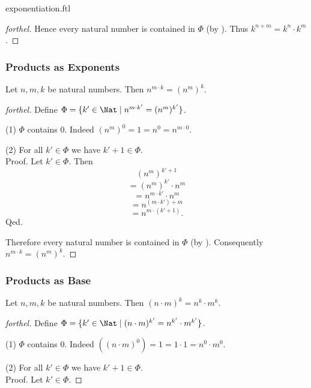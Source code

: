 \documentclass{naproche-library}
\begin{document}
\begin{smodule}{exponentiation.ftl}
\begin{proof}[forthel]
    Hence every natural number is contained in $\Phi$ (by ).
    Thus $k^{n + m} = k^{n} \cdot k^{m}$.
  \end{proof}


  \subsubsection*{Products as Exponents}

  \begin{proposition}[forthel,id=ARITHMETIC_09_7827956571308032]
    Let $n, m, k$ be natural numbers.
    Then $n^{m \cdot k} = (n^{m})^{k}$.
  \end{proposition}
  \begin{proof}[forthel]
    Define $\Phi = \{ k' \in \Nat \mid n^{m \cdot k'} = (n^{m})^{k'} \}$.

    (1) $\Phi$ contains $0$.
    Indeed $(n^{m})^{0}
      = 1
      = n^{0}
      = n^{m \cdot 0}$.

    (2) For all $k' \in \Phi$ we have $k' + 1 \in \Phi$. \\
    Proof.
      Let $k' \in \Phi$.
      Then
      \[  (n^{m})^{k' + 1}                \]
      \[    = (n^{m})^{k'} \cdot n^{m}    \]
      \[    = n^{m \cdot k'} \cdot n^{m}  \]
      \[    = n^{(m \cdot k') + m}        \]
      \[    = n^{m \cdot (k' + 1)}.       \]
    Qed.

    Therefore every natural number is contained in $\Phi$ (by ).
    Consequently $n^{m \cdot k} = (n^{m})^{k}$.
  \end{proof}


  \subsubsection*{Products as Base}

  \begin{proposition}[forthel,id=ARITHMETIC_09_2563032276271104]
    Let $n, m, k$ be natural numbers.
    Then $(n \cdot m)^{k} = n^{k} \cdot m^{k}$.
  \end{proposition}
  \begin{proof}[forthel]
    Define $\Phi = \{ k' \in \Nat \mid (n \cdot m)^{k'} = n^{k'} \cdot m^{k'} \}$.

    (1) $\Phi$ contains $0$.
    Indeed $((n \cdot m)^{0})
      = 1
      = 1 \cdot 1
      = n^{0} \cdot m^{0}$. %

    (2) For all $k' \in \Phi$ we have $k' + 1 \in \Phi$. \\
    Proof.
      Let $k' \in \Phi$.


\end{proof}
\end{smodule}
\end{document}
